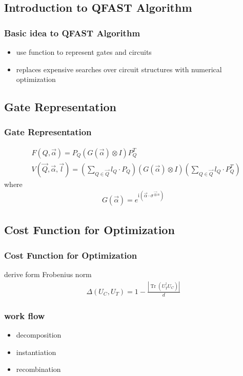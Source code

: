 \documentclass[aspectratio=1610]{beamer}
\begin{document}
\subsection{Introduction to QFAST Algorithm}
\begin{frame}
\frametitle{Basic idea to QFAST Algorithm}
\begin{itemize}
  \item use function to represent gates and circuits
  \item replaces expensive searches over circuit structures with numerical optimization
\end{itemize}
\end{frame}

\subsection{Gate Representation}
\begin{frame}
\frametitle{Gate Representation}

\begin{align}
  &F(Q, \vec{\alpha})=P_{Q}(G(\vec{\alpha}) \otimes I) P_{Q}^{T}\\
  &V(\vec{Q}, \vec{\alpha}, \vec{l})=\left(\sum_{Q \in \vec{Q}} l_{Q} \cdot P_{Q}\right)(G(\vec{\alpha}) \otimes I)\left(\sum_{Q \in \vec{Q}} l_{Q} \cdot P_{Q}^{T}\right)
\end{align}
where
\begin{align}
  G(\vec{\alpha})=e^{\mathrm{i}\left(\vec{\alpha} \cdot \sigma^{\vec{\otimes} n}\right)}
\end{align}
\end{frame}

\subsection{Cost Function for Optimization}
\begin{frame}
\frametitle{Cost Function for Optimization}
derive form Frobenius norm
\begin{align}
  \Delta\left(U_{C}, U_{T}\right)=1-\frac{\left|\operatorname{Tr}\left(U_{T}^{\dagger} U_{C}\right)\right|}{d}
\end{align}
\end{frame}
\begin{frame}
  \frametitle{work flow}
  \begin{itemize}
    \item decomposition
    \item instantiation
    \item recombination
  \end{itemize}
\end{frame}
\end{document}
